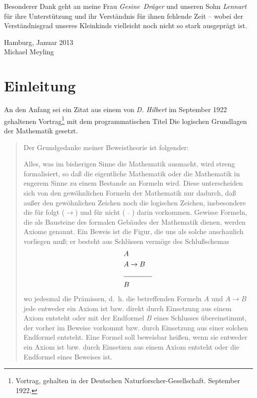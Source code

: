 \documentclass[a4paper,german,10pt,twoside]{book}
\theoremstyle{definition}
\theoremstyle{remark}
\begin{document}
\par
Besonderer Dank geht an meine Frau \emph{Gesine~Dr{\"a}ger} und unseren Sohn \emph{Lennart} f{\"u}r ihre Unterst{\"u}tzung und ihr Verst{\"a}ndnis f{\"u}r ihnen fehlende Zeit -- wobei der Verst{\"a}ndnisgrad unseres Kleinkinds vielleicht noch nicht so stark ausgepr{\"a}gt ist.

\par
\vspace*{1cm} Hamburg, Januar 2013 \\
\hspace*{\fill} Michael Meyling


\chapter*{Einleitung} \label{chapter3} \hypertarget{chapter3}{}

An den Anfang sei ein Zitat aus einem von \emph{D. Hilbert} im September 1922 gehaltenen Vortrag\footnote{Vortrag, gehalten in der Deutschen Naturforscher-Gesellschaft. September 1922.} mit dem programmatischen Titel {\glqq Die logischen Grundlagen der Mathematik\grqq} gesetzt.

\par
\begin{quote} {
\glqq Der Grundgedanke meiner Beweistheorie ist folgender:
\par
Alles, was im bisherigen Sinne die Mathematik ausmacht, wird streng formalisiert, so da{\ss} die eigentliche Mathematik oder die Mathematik in engerem Sinne zu einem Bestande an Formeln wird. Diese unterscheiden sich von den gew{\"o}hnlichen Formeln der Mathematik nur dadurch, da{\ss} au{\ss}er den gew{\"o}hnlichen Zeichen noch die logischen Zeichen, insbesondere die f{\"u}r {\glqq folgt\grqq} ($\rightarrow$) und f{\"u}r {\glqq nicht\grqq} ($\bar{\quad}$) darin vorkommen. Gewisse Formeln, die als Bausteine des formalen Geb{\"a}udes der Mathematik dienen, werden Axiome genannt. Ein Beweis ist die Figur, die uns als solche anschaulich vorliegen mu{\ss}; er besteht aus Schl{\"u}ssen verm{\"o}ge des Schlu{\ss}schemas\\
\begin{eqnarray*}
& A & \\
& A \rightarrow B& \\
\cline{2-3}
 & B &
\end{eqnarray*}
wo jedesmal die Pr{\"a}missen, d.~h. die betreffenden Formeln $A$ und $A \rightarrow B$ jede entweder ein Axiom ist bzw. direkt durch Einsetzung aus einem Axiom entsteht oder mit der Endformel $B$ eines Schlusses {\"u}bereinstimmt, der vorher im Beweise vorkommt bzw. durch Einsetzung aus einer solchen Endformel entsteht. Eine Formel soll beweisbar hei{\ss}en, wenn sie entweder ein Axiom ist bzw. durch Einsetzen aus einem Axiom entsteht oder die Endformel eines Beweises ist.\grqq}
\end{quote}
\end{document}
